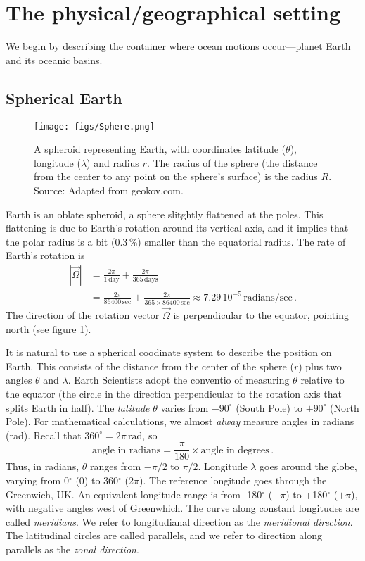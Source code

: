 \documentclass[11pt]{article}
\newcommand{\per}{\,.}
\def\beq{\begin{equation}}
\def\eeq{\end{equation}}
\begin{document}
\section{The physical/geographical setting}


We begin by describing the container where ocean motions occur---planet Earth
and its oceanic basins.

\subsection{Spherical Earth}

\begin{figure}[ht]
\centering
\texttt{[image: figs/Sphere.png]}
\caption{\small A spheroid representing Earth, with coordinates latitude ($\theta$),
longitude ($\lambda$) and radius $r$. The radius of the sphere (the distance from the center
to any point on the sphere's surface) is the radius $R$. Source: Adapted from geokov.com.}
\label{EarthSphere}
\end{figure}

 Earth is an oblate spheroid, a sphere slitghtly
flattened at the poles. This flattening is due to Earth's rotation around its vertical
axis, and it implies
that the polar radius is a bit (0.3\,\%) smaller than the equatorial radius. The rate
of Earth's rotation is
\begin{align}
|\vec{\Omega}| &= \frac{2\pi}{1\, \text{day}} + \frac{2\pi}{365\, \text{days}}\nonumber\\
               &= \frac{2\pi}{86400\, \text{sec}} + \frac{2\pi}{365 \times 86400 \, \text{sec}}
               \approx 7.29\, 10^{-5}\, \text{radians}/\text{sec}\per
\end{align}
The direction of the rotation vector $\vec{\Omega}$ is perpendicular to the equator, pointing north (see figure \ref{EarthSphere}).

It is natural to use a spherical coodinate system to describe the position on Earth.
This consists of the distance from the center of the sphere ($r$) plus two angles $\theta$
and $\lambda$.  Earth Scientists adopt the conventio of measuring $\theta$ relative to the
equator (the circle in the direction perpendicular to the rotation axis that splits Earth in half). The \emph{latitude} $\theta$ varies from $-90^{\circ}$ (South Pole) to
$+90^{\circ}$ (North Pole). For mathematical calculations, we almost \emph{alway} measure angles
in radians (rad). Recall that $360^\circ = 2\pi\,\text{rad}$, so
\beq
\text{angle in radians} =  \frac{\pi}{180} \times \text{angle in degrees} \per
\eeq
Thus, in radians, $\theta$ ranges from $-\pi/2$ to $\pi/2$. Longitude $\lambda$ goes
around the globe, varying from 0$^\circ$ (0) to 360$^\circ$ (2$\pi$). The reference longitude
goes through the Greenwich, UK. An equivalent longitude range is from -180$^\circ$ ($-\pi$) to
+180$^\circ$ ($+\pi$), with negative angles west of Greenwhich. The curve along
constant longitudes are called \emph{meridians}. We refer to longitudianal direction as
the \emph{meridional direction}. The latitudinal circles are called {parallels}, and we refer to
direction along parallels as the \emph{zonal direction}.
\end{document}
